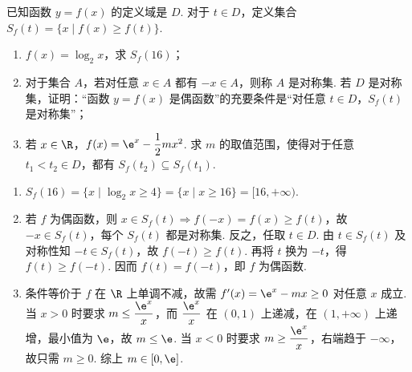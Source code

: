 \begin{problem}
已知函数 \(y=f(x)\) 的定义域是 \(D\). 对于 \(t\in D\)，定义集合 \(S_f(t)=\{x\mid f(x)\ge f(t)\}\).
\begin{enumerate}
\item \(f(x)=\log_2x\)，求 \(S_f(16)\)；
\item 对于集合 \(A\)，若对任意 \(x\in A\) 都有 \(-x\in A\)，则称 \(A\) 是对称集. 若 \(D\) 是对称集，证明：“函数 \(y=f(x)\) 是偶函数”的充要条件是“对任意 \(t\in D\)，\(S_f(t)\) 是对称集”；
\item 若 \(x\in\R\)，\(f(x)=\e^x-\dfrac12mx^2\). 求 \(m\) 的取值范围，使得对于任意 \(t_1<t_2\in D\)，都有 \(S_f(t_2)\subseteq S_f(t_1)\).
\end{enumerate}
\end{problem}

\begin{solution}
\begin{enumerate}
\item \(S_f(16)=\{x\mid\log_2x\ge4\}=\{x\mid x\ge16\}=[16,+\infty)\).
\item 若 \(f\) 为偶函数，则 \(x\in S_f(t)\Rightarrow f(-x)=f(x)\ge f(t)\)，故 \(-x\in S_f(t)\)，每个 \(S_f(t)\) 都是对称集. 反之，任取 \(t\in D\). 由 \(t\in S_f(t)\) 及对称性知 \(-t\in S_f(t)\)，故 \(f(-t)\ge f(t)\). 再将 \(t\) 换为 \(-t\)，得 \(f(t)\ge f(-t)\). 因而 \(f(t)=f(-t)\)，即 \(f\) 为偶函数.
\item 条件等价于 \(f\) 在 \(\R\) 上单调不减，故需 \(f'(x)=\e^x-mx\ge0\) 对任意 \(x\) 成立. 当 \(x>0\) 时要求 \(m\le\dfrac{\e^x}{x}\)，而 \(\dfrac{\e^x}{x}\) 在 \((0,1)\) 上递减，在 \((1,+\infty)\) 上递增，最小值为 \(\e\)，故 \(m\le\e\). 当 \(x<0\) 时要求 \(m\ge\dfrac{\e^x}{x}\)，右端趋于 \(-\infty\)，故只需 \(m\ge0\). 综上 \(m\in[0,\e]\).
\end{enumerate}
\end{solution}
